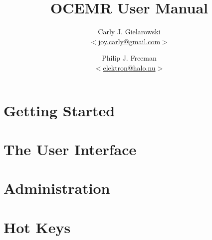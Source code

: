 \documentclass[dvipdfm]{book}
\title{OCEMR User Manual}
\author{
    Carly J. Gielarowski\\
    $<$\href{mailto:joy.carly@gmail.com}{joy.carly@gmail.com}$>$
  \and
    Philip J. Freeman\\
    $<$\href{mailto:elektron@halo.nu}{elektron@halo.nu}$>$
}
\date{}
\begin{document}
\maketitle
\tableofcontents
\chapter{Getting Started}

\chapter{The User Interface}

\chapter{Administration}

\appendix
\chapter{Hot Keys}

\end{document}
